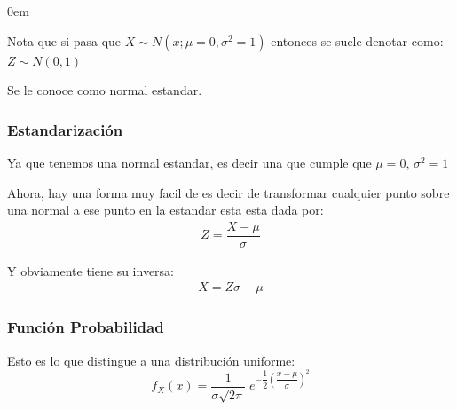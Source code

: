\documentclass[12pt, fleqn]{report}                             %
\newenvironment{SmallIndentation}[1][0.75em]                    %
        {\begin{adjustwidth}{#1}{}\begin{footnotesize}}             %
        {\end{footnotesize}\end{adjustwidth}}                       %
\newcommand \Quote              {\qq}                           %
\theoremstyle{break}                                            %
\newcommand{\Wrap}[1]           {\left( #1 \right)}             %
\newcommand{\pfrac}[2]      {\Wrap{\dfrac{#1}{#2}}}             %
\begin{document}
\begin{multicols}{2}
\begin{SmallIndentation}[0em]
                            Nota que si pasa que $X \sim N(x; \mu = 0, \sigma^2 = 1)$
                            entonces se suele denotar como:
                            \\$Z \sim N(0, 1)$ 

                            Se le conoce como normal estandar.

                    \subsubsection{Estandarización}  

                        Ya que tenemos una normal estandar, es decir una que cumple que $\mu = 0$,
                        $\sigma^2 = 1$

                        Ahora, hay una forma muy facil de \Quote{estandarizar} es decir
                        de transformar cualquier punto sobre una normal a ese punto en la estandar
                        esta esta dada por:
                        \begin{align*}
                            Z = \dfrac{X - \mu}{\sigma}
                        \end{align*}

                        Y obviamente tiene su inversa:
                        \begin{align*}
                            X = Z\sigma  + \mu
                        \end{align*}


                    \subsubsection{Función Probabilidad}

                        Esto es lo que distingue a una distribución uniforme:
                        \begin{equation*}
                            f_X(x) = \dfrac{1}{\sigma \sqrt{2\pi}} \; e^{-\dfrac{1}{2}\pfrac{x - \mu}{\sigma}^2 }
                        \end{equation*}



\end{SmallIndentation}
\end{multicols}
\end{document}
